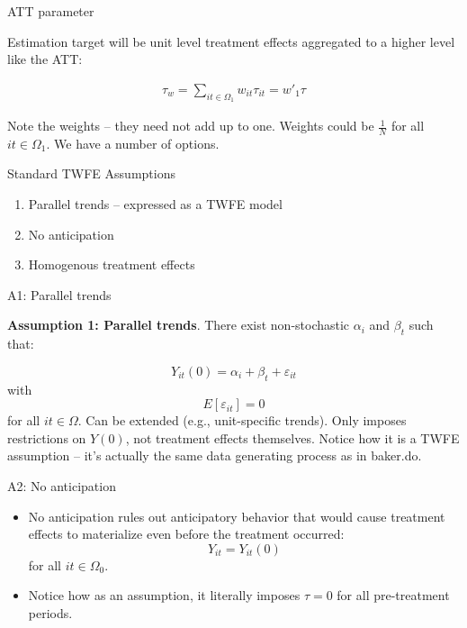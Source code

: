 \documentclass{beamer}
\begin{document}
\begin{frame}{ATT parameter}

Estimation target will be unit level treatment effects aggregated to a higher level like the ATT:

\begin{eqnarray*}
\tau_w = \sum_{it \in \Omega_{1}}w_{it}\tau_{it} = w'_1\tau
\end{eqnarray*}

\bigskip

Note the weights -- they need not add up to one.  Weights could be $\frac{1}{N}$ for all $it \in \Omega_1$. We have a number of options. 


\end{frame}

\begin{frame}{Standard TWFE Assumptions}

\begin{enumerate}
\item Parallel trends -- expressed as a TWFE model
\item No anticipation
\item Homogenous treatment effects
\end{enumerate}

\end{frame}

\begin{frame}{A1: Parallel trends}

\textbf{Assumption 1: Parallel trends}. There exist non-stochastic $\alpha_i$ and $\beta_t$ such that:

$$Y_{it}(0) = \alpha_i + \beta_t + \varepsilon_{it}$$with $$E[\varepsilon_{it}]=0$$for all $it \in \Omega$. Can be extended (e.g., unit-specific trends). Only imposes restrictions on $Y(0)$, not treatment effects themselves. Notice how it is a TWFE assumption -- it's actually the same data generating process as in baker.do.

\end{frame}

\begin{frame}{A2: No anticipation}

\begin{itemize}
\item No anticipation rules out anticipatory behavior that would cause treatment effects to materialize even before the treatment occurred:$$Y_{it} = Y_{it}(0)$$ for all $it \in \Omega_0$. 
\item Notice how as an assumption, it literally imposes $\tau=0$ for all pre-treatment periods. 

\end{itemize}

\end{frame}
\end{document}
